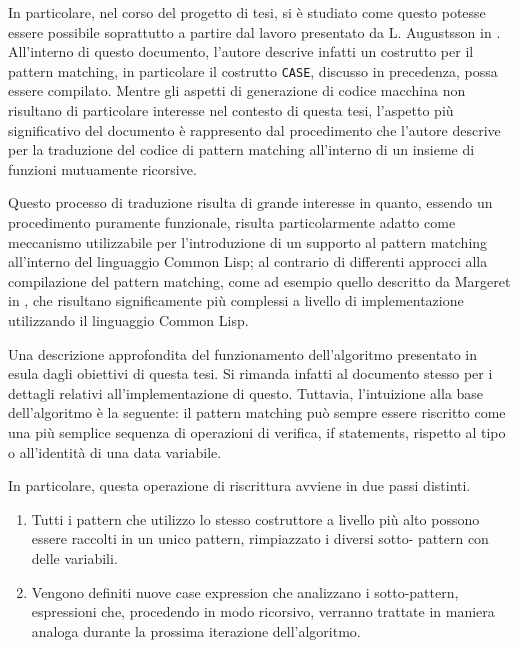 In particolare, nel corso del progetto di tesi, si è studiato come questo
potesse essere possibile soprattutto a partire dal lavoro presentato da L.
Augustsson in \cite{}. All'interno di questo documento, l'autore descrive
infatti un costrutto per il pattern matching, in particolare il costrutto
\texttt{CASE}, discusso in precedenza, possa essere compilato. Mentre gli
aspetti di generazione di codice macchina non risultano di particolare interesse
nel contesto di questa tesi, l'aspetto più significativo del documento è
rappresento dal procedimento che l'autore descrive per la traduzione del codice
di pattern matching all'interno di un insieme di funzioni mutuamente ricorsive.

Questo processo di traduzione risulta di grande interesse in quanto, essendo un
procedimento puramente funzionale, risulta particolarmente adatto come
meccanismo utilizzabile per l'introduzione di un supporto al pattern matching
all'interno del linguaggio Common Lisp; al contrario di differenti approcci alla
compilazione del pattern matching, come ad esempio quello descritto da Margeret
in \cite{}, che risultano significamente più complessi a livello di
implementazione utilizzando il linguaggio Common Lisp.

Una descrizione approfondita del funzionamento dell'algoritmo presentato in
\cite{} esula dagli obiettivi di questa tesi. Si rimanda infatti al documento
stesso per i dettagli relativi all'implementazione di questo. Tuttavia,
l'intuizione alla base dell'algoritmo è la seguente: il pattern matching può
sempre essere riscritto come una più semplice sequenza di operazioni di
verifica, if statements, rispetto al tipo o all'identità di una data variabile.

In particolare, questa operazione di riscrittura avviene in due passi distinti.

\begin{enumerate}

\item Tutti i pattern che utilizzo lo stesso costruttore a livello più alto
possono essere raccolti in un unico pattern, rimpiazzato i diversi sotto-
pattern con delle variabili.

\item Vengono definiti nuove case expression che analizzano i sotto-pattern,
espressioni che, procedendo in modo ricorsivo, verranno trattate in maniera
analoga durante la prossima iterazione dell'algoritmo.

\end{enumerate}

